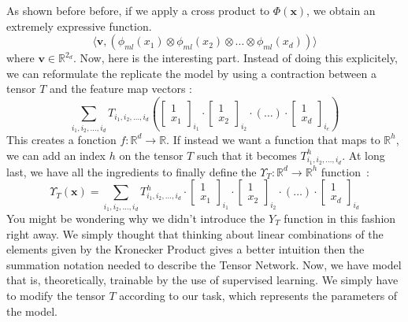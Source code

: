 \documentclass{article}
\theoremstyle{definition}
\theoremstyle{definition}
\begin{document}
As shown before before, if we apply a cross product to $\Phi(\mathbf{x})$, we obtain an extremely expressive function.
\[
    \langle
    \bm{v},
    \left(\phi_{ml}(x_1) \otimes \phi_{ml}(x_2)\otimes \dots \otimes \phi_{ml}(x_d) \right) \rangle
\]
where $\bm{v} \in \mathbb{R}^{2_d}$.
Now, here is the interesting part. Instead of doing this explicitely, we can reformulate the replicate the model by using a contraction between a tensor $T$ and the feature map vectors : 
\[
    \sum_{i_1, i_2, \dots, i_d} T_{i_1, i_2, \dots, i_d}
    \left(
    \begin{bmatrix}
        1 \\ x_1
    \end{bmatrix}_{i_1}
    \cdot
    \begin{bmatrix}
        1 \\ x_2
    \end{bmatrix}_{i_2}
    \cdot
    (\dots)
    \cdot
    \begin{bmatrix}
        1 \\ x_d
    \end{bmatrix}_{i_e}
    \right)
\]
This creates a fonction $f: \mathbb{R}^d \to \mathbb{R}$. If instead we want a function that maps to $\mathbb{R}^h$, we can add an index $h$ on the tensor $T$ such that it becomes $T^{h}_{i_1, i_2, \dots, i_d}$. At long last, we have all the ingredients to finally define the $\Upsilon_T :  \mathbb{R}^d \to \mathbb{R}^h$ function~:
\[
    \Upsilon_T(\mathbf{x}) =     \sum_{i_1, i_2, \dots, i_d} T^{h}_{i_1, i_2, \dots, i_d}
    \cdot
    \begin{bmatrix}
        1 \\ x_1
    \end{bmatrix}_{i_1}
    \cdot
    \begin{bmatrix}
        1 \\ x_2
    \end{bmatrix}_{i_2}
    \cdot
    (\dots)
    \cdot
    \begin{bmatrix}
        1 \\ x_d
    \end{bmatrix}_{i_d}
\]
You might be wondering why we didn't introduce the $Y_T$ function in this fashion right away. We simply thought that thinking about linear combinations of the elements given by the Kronecker Product gives a better intuition then the summation notation needed to describe the Tensor Network. Now, we have model that is, theoretically, trainable by the use of supervised learning. We simply have to modify the tensor $T$ according to our task, which represents the parameters of the model.
\end{document}

